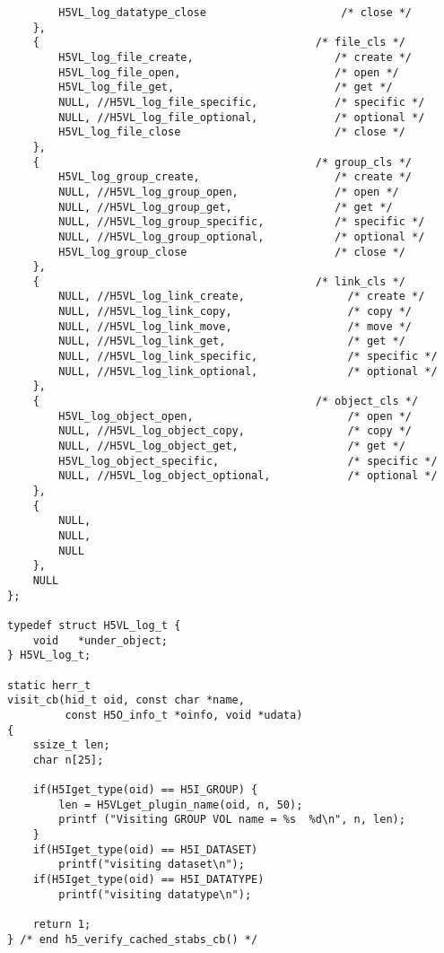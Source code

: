\begin{lstlisting}
        H5VL_log_datatype_close                     /* close */
    },
    {                                           /* file_cls */
        H5VL_log_file_create,                      /* create */
        H5VL_log_file_open,                        /* open */
        H5VL_log_file_get,                         /* get */
        NULL, //H5VL_log_file_specific,            /* specific */
        NULL, //H5VL_log_file_optional,            /* optional */
        H5VL_log_file_close                        /* close */
    },
    {                                           /* group_cls */
        H5VL_log_group_create,                     /* create */
        NULL, //H5VL_log_group_open,               /* open */
        NULL, //H5VL_log_group_get,                /* get */
        NULL, //H5VL_log_group_specific,           /* specific */
        NULL, //H5VL_log_group_optional,           /* optional */
        H5VL_log_group_close                       /* close */
    },
    {                                           /* link_cls */
        NULL, //H5VL_log_link_create,                /* create */
        NULL, //H5VL_log_link_copy,                  /* copy */
        NULL, //H5VL_log_link_move,                  /* move */
        NULL, //H5VL_log_link_get,                   /* get */
        NULL, //H5VL_log_link_specific,              /* specific */
        NULL, //H5VL_log_link_optional,              /* optional */
    },
    {                                           /* object_cls */
        H5VL_log_object_open,                        /* open */
        NULL, //H5VL_log_object_copy,                /* copy */
        NULL, //H5VL_log_object_get,                 /* get */
        H5VL_log_object_specific,                    /* specific */
        NULL, //H5VL_log_object_optional,            /* optional */
    },
    {
        NULL,
        NULL,
        NULL
    },
    NULL
};

typedef struct H5VL_log_t {
    void   *under_object;
} H5VL_log_t;

static herr_t
visit_cb(hid_t oid, const char *name,
         const H5O_info_t *oinfo, void *udata)
{
    ssize_t len;
    char n[25];

    if(H5Iget_type(oid) == H5I_GROUP) {
        len = H5VLget_plugin_name(oid, n, 50);
        printf ("Visiting GROUP VOL name = %s  %d\n", n, len);
    }
    if(H5Iget_type(oid) == H5I_DATASET) 
        printf("visiting dataset\n");
    if(H5Iget_type(oid) == H5I_DATATYPE) 
        printf("visiting datatype\n");

    return 1;
} /* end h5_verify_cached_stabs_cb() */


\end{lstlisting}
